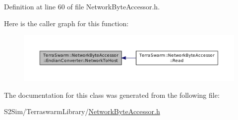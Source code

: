 Definition at line 60 of file Network\-Byte\-Accessor.\-h.



Here is the caller graph for this function\-:\nopagebreak
\begin{figure}[H]
\begin{center}
\leavevmode
\includegraphics[width=350pt]{class_terra_swarm_1_1_network_byte_accessor_1_1_endian_converter_aa33fe4997f3ec0957f43d003b925f224_icgraph}
\end{center}
\end{figure}




The documentation for this class was generated from the following file\-:\begin{DoxyCompactItemize}
\item 
S2\-Sim/\-Terraswarm\-Library/\hyperlink{_network_byte_accessor_8h}{Network\-Byte\-Accessor.\-h}\end{DoxyCompactItemize}
